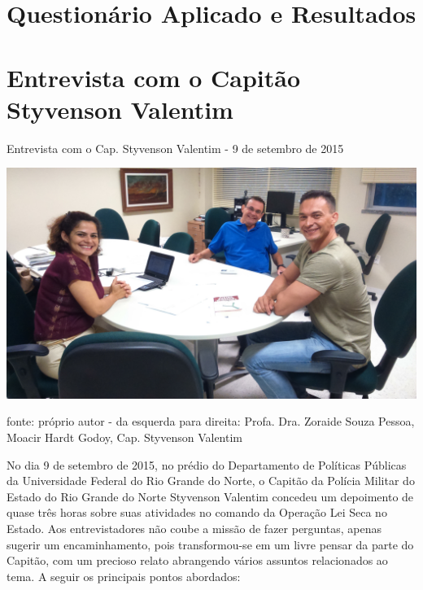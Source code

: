 \documentclass[
	12pt,				%
	openright,			%
	twoside,			%
	a4paper,			%
	chapter=TITLE,		%
	section=TITLE,		%
	subsection=TITLE,	%
	subsubsection=TITLE,%
	spanish,            %
	english,			%
	brazil				%
	]{abntex2}
\begin{document}
\begin{anexosenv}

\partanexos
\chapter{Questionário Aplicado e Resultados}



\chapter{Entrevista com o Capitão Styvenson Valentim}
\begin{foto}[!htpb]
	\caption{\label{FotoS}Entrevista com o Cap. Styvenson Valentim - 9 de setembro de 2015}
	\begin{center}
		\includegraphics[scale=0.14]{entrevista.jpg}
	\end{center}
	\ABNTEXchapterfont\small{fonte: próprio autor - da esquerda para direita: Profa. Dra. Zoraide Souza Pessoa, Moacir Hardt Godoy, Cap. Styvenson Valentim}
\end{foto}
No dia 9 de setembro de 2015, no prédio do Departamento de Políticas Públicas da Universidade Federal do Rio Grande do Norte, o Capitão da Polícia Militar do Estado do Rio Grande do Norte Styvenson Valentim concedeu um depoimento de quase três horas sobre suas atividades no comando da Operação Lei Seca no Estado. Aos entrevistadores não coube a missão de fazer perguntas, apenas sugerir um encaminhamento, pois transformou-se em um livre pensar da parte do Capitão, com um precioso relato abrangendo vários assuntos relacionados ao tema. A seguir os principais pontos abordados:\\

\end{anexosenv}
\end{document}
